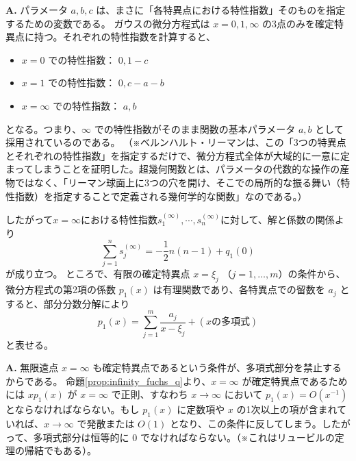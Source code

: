 \begin{Q}
\textbf{A.} パラメータ $a, b, c$ は、まさに「各特異点における特性指数」そのものを指定するための変数である。
ガウスの微分方程式は $x=0, 1, \infty$ の3点のみを確定特異点に持つ。それぞれの特性指数を計算すると、
\begin{itemize}
    \item $x=0$ での特性指数： $0, 1-c$
    \item $x=1$ での特性指数： $0, c-a-b$
    \item $x=\infty$ での特性指数： $a, b$
\end{itemize}
となる。つまり、$\infty$ での特性指数がそのまま関数の基本パラメータ $a, b$ として採用されているのである。
（※ベルンハルト・リーマンは、この「3つの特異点とそれぞれの特性指数」を指定するだけで、微分方程式全体が大域的に一意に定まってしまうことを証明した。超幾何関数とは、パラメータの代数的な操作の産物ではなく、「リーマン球面上に3つの穴を開け、そこでの局所的な振る舞い（特性指数）を指定することで定義される幾何学的な関数」なのである。）
\end{Q}
したがって$x=\infty$における特性指数$s_{1}^{(\infty)},\cdots,s_{n}^{(\infty)}$に対して、解と係数の関係より
\begin{equation}\label{eq:sum-of-infinity-exponents}
\sum_{j=1}^{n} s_{j}^{(\infty)} = -\frac{1}{2}n(n-1) + q_{1}(0)
\end{equation}
が成り立つ。
ところで、有限の確定特異点 $x=\xi_{j}$ （$j=1, \dots, m$）の条件から、微分方程式の第2項の係数 $p_{1}(x)$ は有理関数であり、各特異点での留数を $a_{j}$ とすると、部分分数分解により
\[
p_{1}(x) = \sum_{j=1}^{m} \frac{a_{j}}{x-\xi_{j}} + (x\text{の多項式})
\]
と表せる。

\begin{Q}
\textbf{A.} 無限遠点 $x=\infty$ も確定特異点であるという条件が、多項式部分を禁止するからである。
命題\ref{prop:infinity_fuchs_q}より、$x=\infty$ が確定特異点であるためには $x p_{1}(x)$ が $x=\infty$ で正則、すなわち $x \to \infty$ において $p_{1}(x) = O(x^{-1})$ とならなければならない。もし $p_{1}(x)$ に定数項や $x$ の1次以上の項が含まれていれば、$x \to \infty$ で発散または $O(1)$ となり、この条件に反してしまう。したがって、多項式部分は恒等的に $0$ でなければならない。（※これはリュービルの定理の帰結でもある）。
\end{Q}

